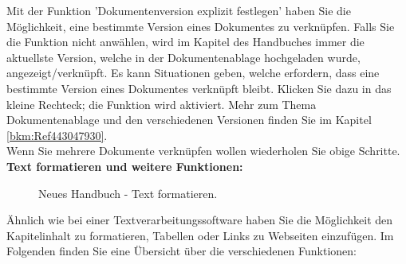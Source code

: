 Mit der Funktion 'Dokumentenversion explizit festlegen'  haben Sie die Möglichkeit, eine bestimmte Version eines Dokumentes zu verknüpfen. Falls Sie die Funktion nicht anwählen, wird im Kapitel des Handbuches immer die aktuellste Version, welche in der Dokumentenablage hochgeladen wurde, angezeigt/verknüpft. Es kann Situationen geben, welche erfordern, dass eine bestimmte Version eines Dokumentes verknüpft bleibt. Klicken Sie dazu in das kleine Rechteck; die Funktion wird aktiviert. Mehr zum Thema Dokumentenablage und den verschiedenen Versionen finden Sie im Kapitel \ref{bkm:Ref443047930}. \\

Wenn Sie mehrere Dokumente verknüpfen wollen wiederholen Sie obige Schritte. \\

\pagebreak
\textbf{Text formatieren und weitere Funktionen:}

\begin{figure}[H]
\caption{Neues Handbuch - Text formatieren.}
\end{figure}

Ähnlich wie bei einer Textverarbeitungssoftware haben Sie die Möglichkeit den Kapitelinhalt zu formatieren, Tabellen oder Links zu Webseiten einzufügen. Im Folgenden finden Sie eine Übersicht über die verschiedenen Funktionen: \\

